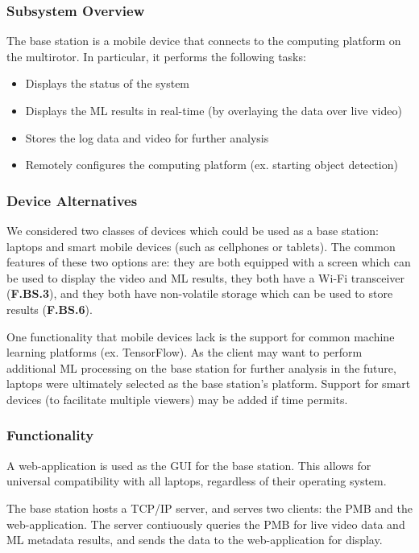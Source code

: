 \subsubsection{Subsystem Overview}

The base station is a mobile device that connects to the computing platform on the multirotor. In particular, it performs the following tasks:
\begin{itemize}
    \item Displays the status of the system
    \item Displays the ML results in real-time (by overlaying the data over live video)
    \item Stores the log data and video for further analysis
    \item Remotely configures the computing platform (ex. starting object detection)
\end{itemize}

\subsubsection{Device Alternatives}
We considered two classes of devices which could be used as a base station: laptops and smart mobile devices (such as cellphones or tablets). The common features of these two options are: they are both equipped with a screen which can be used to display the video and ML results, they both have a Wi-Fi transceiver (\textbf{F.BS.3}), and they both have non-volatile storage which can be used to store results (\textbf{F.BS.6}).

One functionality that mobile devices lack is the support for common machine learning platforms (ex. TensorFlow). As the client may want to perform additional ML processing on the base station for further analysis in the future, laptops were ultimately selected as the base station's platform. Support for smart devices (to facilitate multiple viewers) may be added if time permits.

\subsubsection{Functionality}
A web-application is used as the GUI for the base station. This allows for universal compatibility with all laptops, regardless of their operating system.

The base station hosts a TCP/IP server, and serves two clients: the PMB and the web-application. The server contiuously queries the PMB for live video data and ML metadata results, and sends the data to the web-application for display.

